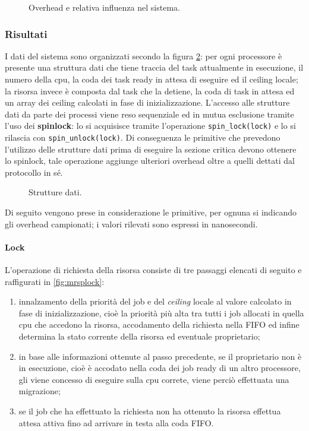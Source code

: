 \begin{figure}
\centering
{}
\caption{Overhead e relativa influenza nel sistema.}
\label{fig:overheads_suffered}
\end{figure}

\subsubsection{Risultati}
\label{sec:overhead_ris}

\noindent I dati del sistema sono organizzati secondo la figura \ref{fig:datas}: per ogni processore è presente una struttura dati che tiene traccia del task attualmente in esecuzione, il numero della cpu, la coda dei task ready in attesa di eseguire ed il ceiling locale; la risorsa invece è composta dal task che la detiene, la coda di task in attesa ed un array dei ceiling calcolati in fase di inizializzazione. L'accesso alle strutture dati da parte dei processi viene reso sequenziale ed in mutua esclusione tramite l'uso dei \textbf{spinlock}: lo si acquisisce tramite l'operazione \texttt{spin\_lock(lock)} e lo si rilascia con \texttt{spin\_unlock(lock)}. Di conseguenza le primitive che prevedono l'utilizzo delle strutture dati prima di eseguire la sezione critica devono ottenere lo spinlock, tale operazione aggiunge ulteriori overhead oltre a quelli dettati dal protocollo in sé.\\

\begin{figure}
\centering
{}
\caption{Strutture dati.}
\label{fig:datas}
\end{figure}


\noindent Di seguito vengono prese in considerazione le primitive, per ognuna si indicando gli overhead campionati; i valori rilevati sono espressi in nanosecondi.

\paragraph{Lock}  L'operazione di richiesta della risorsa consiste di tre passaggi elencati di seguito e raffigurati in \ref{fig:mrsplock}:

\begin{enumerate}
	\item innalzamento della priorità del job e del \textit{ceiling} locale al valore calcolato in fase di inizializzazione, cioè la priorità più alta tra tutti i job allocati in quella cpu che accedono la risorsa, accodamento della richiesta nella FIFO ed infine determina la stato corrente della risorsa ed eventuale proprietario;
	\item in base alle informazioni ottenute al passo precedente, se il proprietario non è in esecuzione, cioè è accodato nella coda dei job ready di un altro processore, gli viene concesso di eseguire sulla cpu correte, viene perciò effettuata una migrazione;
	\item se il job che ha effettuato la richiesta non ha ottenuto la risorsa effettua attesa attiva fino ad arrivare in testa alla coda FIFO.
\end{enumerate}

